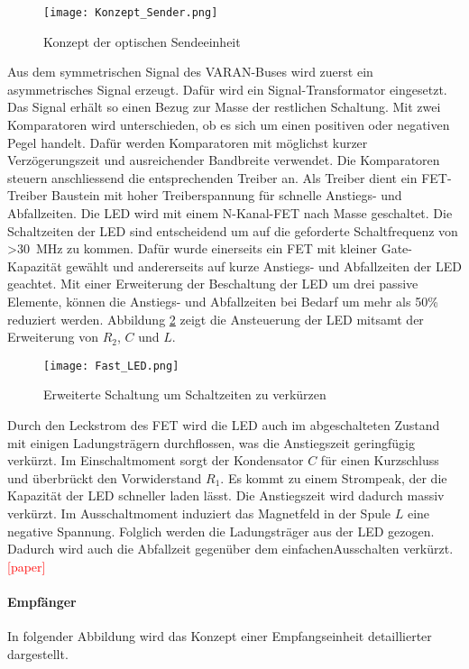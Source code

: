 \begin{figure}[H]
	\centering
	\texttt{[image: Konzept\_Sender.png]}
	\caption{Konzept der optischen Sendeeinheit}\label{fig:Konzept_Sender}
\end{figure}

Aus dem symmetrischen Signal des VARAN-Buses wird zuerst ein asymmetrisches Signal erzeugt. Dafür wird ein Signal-Transformator eingesetzt. Das Signal erhält so einen Bezug zur Masse der restlichen Schaltung. Mit zwei Komparatoren wird unterschieden, ob es sich um einen positiven oder negativen Pegel handelt. Dafür werden Komparatoren mit möglichst kurzer Verzögerungszeit und ausreichender Bandbreite verwendet. Die Komparatoren steuern anschliessend die entsprechenden Treiber an. 
\newline
Als Treiber dient ein FET-Treiber Baustein mit hoher Treiberspannung für schnelle Anstiegs- und Abfallzeiten. Die LED wird mit einem N-Kanal-FET nach Masse geschaltet. Die Schaltzeiten der LED sind entscheidend um auf die geforderte Schaltfrequenz von \textgreater \SI{30}{MHz} zu kommen. Dafür wurde einerseits ein FET mit kleiner Gate-Kapazität gewählt und andererseits auf kurze Anstiegs- und Abfallzeiten der LED geachtet.
\newline
Mit einer Erweiterung der Beschaltung der LED um drei passive Elemente, können die Anstiegs- und Abfallzeiten bei Bedarf um mehr als 50\% reduziert werden. Abbildung \ref{fig:Fast_LED} zeigt die Ansteuerung der LED mitsamt der Erweiterung von $R_{2}$, $C$ und $L$.

 \begin{figure}[h]
 	\centering
 	\texttt{[image: Fast\_LED.png]}
 	\caption{Erweiterte Schaltung um Schaltzeiten zu verkürzen}\label{fig:Fast_LED}
 \end{figure}

Durch den Leckstrom des FET wird die LED auch im abgeschalteten Zustand mit einigen Ladungsträgern durchflossen, was die Anstiegszeit geringfügig verkürzt. Im Einschaltmoment sorgt der Kondensator $C$ für einen Kurzschluss und überbrückt den Vorwiderstand $R_{1}$. Es kommt zu einem Strompeak, der die Kapazität der LED schneller laden lässt. Die Anstiegszeit wird dadurch massiv verkürzt. Im Ausschaltmoment induziert das Magnetfeld in der Spule $L$ eine negative Spannung. Folglich werden die Ladungsträger aus der LED gezogen. Dadurch wird auch die Abfallzeit gegenüber dem \glqq einfachen\grqq Ausschalten verkürzt.\textcolor{red}{[paper]}

\paragraph{Empfänger}
In folgender Abbildung wird das Konzept einer Empfangseinheit detaillierter dargestellt.

